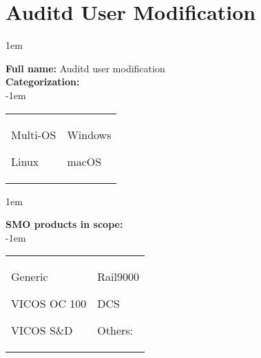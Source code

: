 
%
%

\section{Auditd User Modification}
\label{15601}

\openup 1em

\textbf{Full name:} Auditd user modification\hrulefill \\
{\bf Categorization:} \\

\openup -1em
\vspace{-3em}

\begin{tabular}{p{}p{}}

\begin{todolist}
  	\item Multi-OS
	\item[\done] Linux
\end{todolist}
&
\begin{todolist}
	\item Windows
	\item macOS
\end{todolist}

\end{tabular}

\openup 1em

{\bf SMO products in scope:} \\

\openup -1em
\vspace{-3em}

\begin{tabular}{p{}p{}}

\begin{todolist}
  \item[\done] Generic
  \item VICOS OC 100
  \item VICOS S\&D
\end{todolist}
&
\begin{todolist}
  \item[\done] Rail9000
  \item[\done] DCS
  \item Others: \hrulefill
\end{todolist}

\end{tabular}

